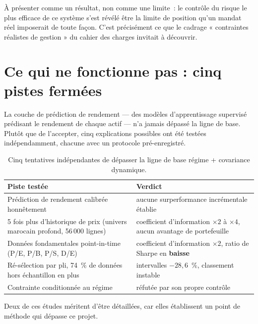 \begin{remarquebox}
À présenter comme un résultat, non comme une limite~: le contrôle du risque le
plus efficace de ce système s'est révélé être la limite de position qu'un mandat
réel imposerait de toute façon. C'est précisément ce que le cadrage
« contraintes réalistes de gestion » du cahier des charges invitait à découvrir.
\end{remarquebox}

\section{Ce qui ne fonctionne pas : cinq pistes fermées}

La couche de prédiction de rendement — des modèles d'apprentissage supervisé
prédisant le rendement de chaque actif — n'a jamais dépassé la ligne de base.
Plutôt que de l'accepter, cinq explications possibles ont été testées
indépendamment, chacune avec un protocole pré-enregistré.

\begin{table}[htbp]
  \centering
  \caption[Les cinq pistes testées]{Cinq tentatives indépendantes de dépasser la
  ligne de base régime + covariance dynamique.}
  \label{tab:cinq-pistes}
  \small
  \begin{tabular}{p{7.4cm}p{7.2cm}}
    \toprule
    Piste testée & Verdict \\
    \midrule
    Prédiction de rendement calibrée honnêtement & aucune surperformance incrémentale établie \\
    5 fois plus d'historique de prix (univers marocain profond, 56\,000 lignes) &
      coefficient d'information $\times 2$ à $\times 4$, aucun avantage de portefeuille \\
    Données fondamentales point-in-time (P/E, P/B, P/S, D/E) &
      coefficient d'information $\times 2$, ratio de Sharpe en \textbf{baisse} \\
    Ré-sélection par pli, 74~\% de données hors échantillon en plus &
      intervalles $-28{,}6$~\%, classement instable \\
    Contrainte conditionnée au régime & réfutée par son propre contrôle \\
    \bottomrule
  \end{tabular}
\end{table}

Deux de ces études méritent d'être détaillées, car elles établissent un point de
méthode qui dépasse ce projet.

